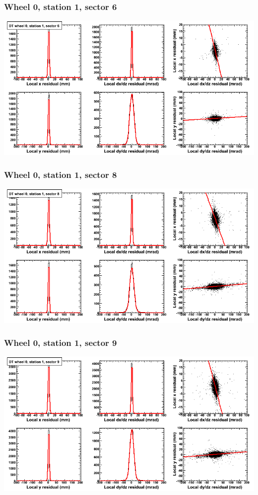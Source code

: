 \documentclass[compress]{beamer}
\begin{document}
\begin{frame}
\frametitle{Wheel 0, station 1, sector 6}
\includegraphics[width=\linewidth]{tmpbell_MBwhCst1sec06.png}
\end{frame}

\begin{frame}
\frametitle{Wheel 0, station 1, sector 8}
\includegraphics[width=\linewidth]{tmpbell_MBwhCst1sec08.png}
\end{frame}

\begin{frame}
\frametitle{Wheel 0, station 1, sector 9}
\includegraphics[width=\linewidth]{tmpbell_MBwhCst1sec09.png}
\end{frame}
\end{document}
